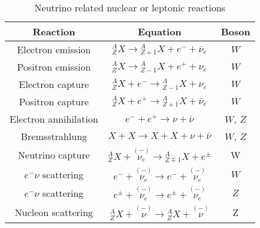 \begin{table}[ht]
\centering
 \begin{tabular}{|c | c | c|}
 \hline
 Reaction & Equation & Boson   \\ [0.5ex]
 \hline
 Electron emission & ${}^A_Z X \to {}^A_{Z+1}X + e^- +\bar \nu_e$ & $W$  \\
 Positron emission & ${}^A_Z X \to {}^A_{Z-1}X + e^+ + \nu_e$ & $W$  \\
 Electron capture & ${}^A_Z X + e^- \to {}^A_{Z-1}X  + \nu_e$ &  $W$ \\
 Positron capture & ${}^A_Z X + e^+ \to {}^A_{Z+1}X  + \bar\nu_e$ &  $W$ \\
 [0.5ex]
 \hline

 Electron annihilation &  $e^- + e^+  \to \nu + \bar\nu $  & $W$, $Z$ \\
 Bremsstrahlung & $X+X \to X + X + \nu + \bar\nu$ & $W$, $Z$ \\
 [0.5ex]
 \hline

  Neutrino capture & ${}^A_{Z}X + \overset{(-)}{\nu_e} \to {}^A_{Z\mp 1}X + e^\pm $ & W\\
  [1ex]
 \hline
 $e^-\nu$ scattering & $e^- + \overset{(-)}{\nu_e} \to e^- + \overset{(-)}{\nu_e} $ &  $W$ \\
 $e^-\nu$ scattering & $e^{\pm} + \overset{(-)}{\nu_e} \to e^{\pm} + \overset{(-)}{\nu_e} $ &  $Z$ \\
 Nucleon scattering & $ {}^A_Z X + \overset{(-)}{\nu} \to {}^A_Z X + \overset{(-)}{\nu} $ &  Z\\
 [0.5ex]
 \hline
 \end{tabular}
 \caption{Neutrino related nuclear or leptonic reactions}
\label{table:Neutrino_Reactions}
\end{table}


